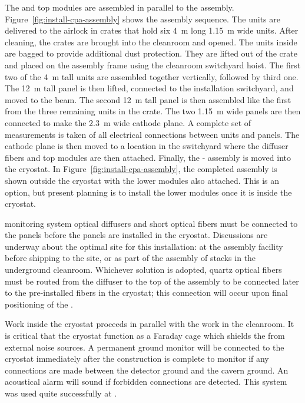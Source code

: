 The  and top  modules are assembled in parallel to the  assembly. Figure~\ref{fig:install-cpa-assembly} shows the  assembly sequence. The  units are delivered to the airlock in crates that hold six \SI{4}{m} long \SI{1.15}{m} wide units. After cleaning, the crates are brought into the cleanroom and opened. The  units inside are bagged to provide additional dust protection. They are lifted out of the crate and placed on the assembly frame using the cleanroom switchyard hoist. 
The first two of the \SI{4}{m} tall units are assembled together vertically, followed by third one.
The \SI{12}{m} tall  panel is then lifted, connected to the installation switchyard, and moved to the  beam. The second \SI{12}{m} tall panel is then assembled like the first from the three remaining  units in the crate. 
The two \SI{1.15}{m} wide panels are then connected to make the \SI{2.3}{m} wide cathode plane.  
A complete set of  measurements is taken of all electrical connections between units and panels.  
The cathode plane  is then moved to a location in the switchyard where the diffuser fibers and top  modules are then attached. 
Finally, the - assembly is moved into the cryostat.
In Figure~\ref{fig:install-cpa-assembly}, the completed assembly is shown outside the cryostat with the lower  modules also attached. 
This is an option, but present planning is to install the lower  modules once it is inside the cryostat. 


 monitoring system optical diffusers and short optical fibers must be connected to the  panels before the panels are installed in the cryostat.  
Discussions are underway about the optimal site for this installation:  at the  assembly facility before shipping to the site, or as part of the assembly of  stacks in the underground cleanroom.  
Whichever solution is adopted, quartz optical fibers must be routed from the diffuser to the top of the  assembly to be connected later to the pre-installed fibers in the cryostat; this connection will occur upon final positioning of the .  

Work inside the cryostat proceeds in parallel with the work in the cleanroom. It is critical that the cryostat function as a Faraday cage which shields the  from external noise sources. A permanent ground monitor will be connected to the cryostat immediately after the construction is complete to monitor if any connections are made between the detector ground and the cavern ground. An acoustical alarm will sound if forbidden connections are detected. This system was used quite successfully at .

